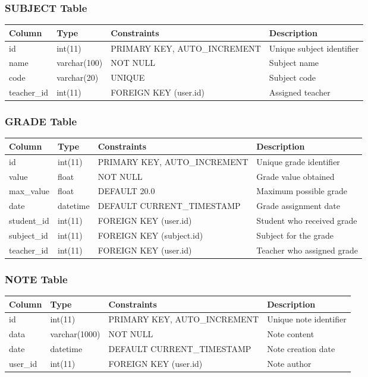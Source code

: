 \documentclass[12pt,a4paper]{article}
\begin{document}
\subsubsection{SUBJECT Table}
\begin{longtable}{|p{3cm}|p{2cm}|p{2cm}|p{6cm}|}
\hline
\textbf{Column} & \textbf{Type} & \textbf{Constraints} & \textbf{Description} \\
\hline
\endhead
id & int(11) & PRIMARY KEY, AUTO\_INCREMENT & Unique subject identifier \\
\hline
name & varchar(100) & NOT NULL & Subject name \\
\hline
code & varchar(20) & UNIQUE & Subject code \\
\hline
teacher\_id & int(11) & FOREIGN KEY (user.id) & Assigned teacher \\
\hline
\end{longtable}

\subsubsection{GRADE Table}
\begin{longtable}{|p{3cm}|p{2cm}|p{2cm}|p{6cm}|}
\hline
\textbf{Column} & \textbf{Type} & \textbf{Constraints} & \textbf{Description} \\
\hline
\endhead
id & int(11) & PRIMARY KEY, AUTO\_INCREMENT & Unique grade identifier \\
\hline
value & float & NOT NULL & Grade value obtained \\
\hline
max\_value & float & DEFAULT 20.0 & Maximum possible grade \\
\hline
date & datetime & DEFAULT CURRENT\_TIMESTAMP & Grade assignment date \\
\hline
student\_id & int(11) & FOREIGN KEY (user.id) & Student who received grade \\
\hline
subject\_id & int(11) & FOREIGN KEY (subject.id) & Subject for the grade \\
\hline
teacher\_id & int(11) & FOREIGN KEY (user.id) & Teacher who assigned grade \\
\hline
\end{longtable}

\subsubsection{NOTE Table}
\begin{longtable}{|p{3cm}|p{2cm}|p{2cm}|p{6cm}|}
\hline
\textbf{Column} & \textbf{Type} & \textbf{Constraints} & \textbf{Description} \\
\hline
\endhead
id & int(11) & PRIMARY KEY, AUTO\_INCREMENT & Unique note identifier \\
\hline
data & varchar(1000) & NOT NULL & Note content \\
\hline
date & datetime & DEFAULT CURRENT\_TIMESTAMP & Note creation date \\
\hline
user\_id & int(11) & FOREIGN KEY (user.id) & Note author \\
\hline
\end{longtable}
\end{document}
